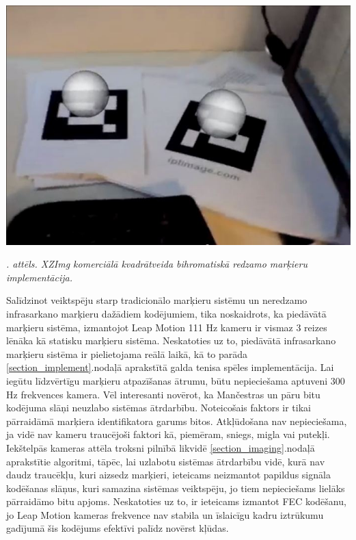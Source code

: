 \documentclass[12pt, a4paper, oneside, openright]{article}
\renewcommand{\thecimages}{\arabic{cimages}}
\begin{document}
\label{cimages:xzimg.png}
\vspace{10pt}
\begin{samepage}
\begin{center}
\includegraphics[width=0.4\columnwidth]{images/xzimg.jpg}
\begin{center}
\footnotesize{
\textit{\thecimages. attēls. XZImg komerciālā kvadrātveida bihromatiskā redzamo marķieru implementācija.}}
\end{center}
\end{center}
\end{samepage}

\newpage
\par
Salīdzinot veiktspēju starp tradicionālo marķieru sistēmu un neredzamo infrasarkano marķieru dažādiem kodējumiem,
tika noskaidrots, ka piedāvātā marķieru sistēma, izmantojot Leap Motion 111 Hz kameru ir vismaz 3 reizes lēnāka
kā statisku marķieru sistēma. Neskatoties uz to, piedāvātā infrasarkano marķieru sistēma ir pielietojama 
reālā laikā, kā to parāda \ref{section_implement}.nodaļā aprakstītā galda tenisa spēles implementācija.
Lai iegūtu līdzvērtīgu marķieru atpazīšanas ātrumu, būtu nepieciešama aptuveni 300 Hz frekvences kamera.
Vēl interesanti novērot, ka Mančestras un pāru bitu kodējuma slāņi neuzlabo sistēmas ātrdarbību.
Noteicošais faktors ir tikai pārraidāmā marķiera identifikatora garums bitos. Atkļūdošana nav nepieciešama,
ja vidē nav kameru traucējoši faktori kā, piemēram, sniegs, migla vai putekļi. Iekštelpās kameras attēla troksni pilnībā
likvidē \ref{section_imaging}.nodaļā aprakstītie algoritmi, tāpēc, lai uzlabotu sistēmas ātrdarbību vidē, kurā
nav daudz traucēkļu, kuri aizsedz marķieri, ieteicams neizmantot papildus signāla kodēšanas slāņus, kuri
samazina sistēmas veiktspēju, jo tiem nepieciešams lielāks pārraidāmo bitu apjoms. Neskatoties uz to, ir 
ieteicams izmantot FEC kodēšanu, jo Leap Motion kameras frekvence nav stabila un īslaicīgu kadru iztrūkumu gadījumā
šis kodējums efektīvi palīdz novērst kļūdas.
\end{document}
